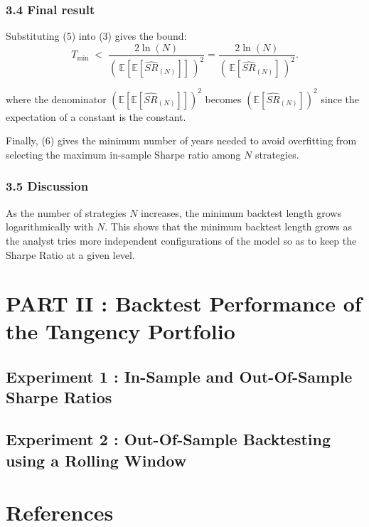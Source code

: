 \documentclass[
  12pt,
]{article}
\begin{document}
\subsubsection{3.4 Final result}\label{final-result}

Substituting (5) into (3) gives the bound:\[
T_{\min} \;<\; \frac{2\ln(N)}{(\,\mathbb{E}[\mathbb{E}[\widehat{SR}_{(N)}]]\,)^2}=\frac{2\ln(N)}{(\,\mathbb{E}[\widehat{SR}_{(N)}]\,)^2}. \tag{6}
\]

where the denominator \((\mathbb{E}[\mathbb{E}[\widehat{SR}_{(N)}]])^2\)
becomes \((\mathbb{ E}[\widehat{SR}_{(N)}])^2\) since the expectation of
a constant is the constant.

Finally, (6) gives the minimum number of years needed to avoid
overfitting from selecting the maximum in-sample Sharpe ratio among
\(N\) strategies.

\subsubsection{3.5 Discussion}\label{discussion}

As the number of strategies \(N\) increases, the minimum backtest length
grows logarithmically with \(N\). This shows that the minimum backtest
length grows as the analyst tries more independent configurations of the
model so as to keep the Sharpe Ratio at a given level.

\section{PART II : Backtest Performance of the Tangency
Portfolio}\label{part-ii-backtest-performance-of-the-tangency-portfolio}

\subsection{Experiment 1 : In-Sample and Out-Of-Sample Sharpe
Ratios}\label{experiment-1-in-sample-and-out-of-sample-sharpe-ratios}

\subsection{Experiment 2 : Out-Of-Sample Backtesting using a Rolling
Window}\label{experiment-2-out-of-sample-backtesting-using-a-rolling-window}

\newpage

\section{References}\label{references}
\end{document}
